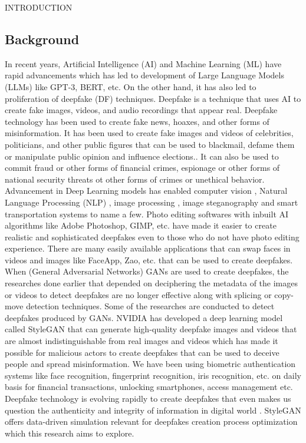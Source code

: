 \begin{section}[]{\uppercase{Introduction}}


    \subsection{Background}
    In recent years, Artificial Intelligence (AI) and Machine Learning (ML) have rapid advancements which has led to development of Large Language Models (LLMs) like GPT-3, BERT, etc. 
    On the other hand, it has also led to proliferation of deepfake (DF) techniques. 
    Deepfake is a technique that uses AI to create fake images, videos, and audio recordings that appear real. 
    Deepfake technology has been used to create fake news, hoaxes, and other forms of misinformation. 
    It has been used to create fake images and videos of celebrities, politicians, and other public figures that can be used to blackmail, defame them or manipulate public opinion and influence elections.. 
    It can also be used to commit fraud or other forms of financial crimes, espionage or other forms of national security threats ot other forms of crimes or unethical behavior. \cite{Gaur2022}
    Advancement in Deep Learning models has enabled computer vision \cite{Guo2022}, Natural Language Processing (NLP) \cite{Shahi2021}, image processing \cite{Sitaula2022}, image steganography \cite{Bhandari2022} and smart transportation systems \cite{Gaur2022} to name a few.
    Photo editing softwares with inbuilt AI algorithms like Adobe Photoshop, GIMP, etc. have made it easier to create realistic and sophisticated deepfakes even to those who do not have photo editing experience. \cite{Wang2020}
    There are many easily available applications that can swap faces in videos and images like FaceApp, Zao, etc. that can be used to create deepfakes.
    When (General Adversarial Networks) GANs are used to create deepfakes, the researches done earlier that depended on deciphering the metadata of the images or videos to detect deepfakes are no longer effective along with splicing or copy-move detection techniques. Some of the researches are conducted to detect deepfakes produced by GANs. \cite{Li2022}
    NVIDIA has developed a deep learning model called StyleGAN that can generate high-quality deepfake images and videos that are almost indistinguishable from real images and videos which has made it possible for malicious actors to create deepfakes that can be used to deceive people and spread misinformation. \cite{Wong2022}
    We have been using biometric authentication systems like face recognition, fingerprint recognition, iris recognition, etc. on daily basis for financial transactions, unlocking smartphones, access management etc. \cite{Tran2017}
    Deepfake technology is evolving rapidly to create deepfakes that even makes us question the authenticity and integrity of information in digital world \Cites{Dang2020}{Rossler2019}.
    StyleGAN offers data-driven simulation relevant for deepfakes creation process optimization \cite{Zotov2022} which this research aims to explore.


\end{section}
